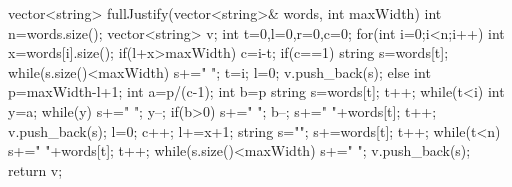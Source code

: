   vector<string> fullJustify(vector<string>& words, int maxWidth) {
        int n=words.size();
        vector<string> v;
        int t=0,l=0,r=0,c=0;
        for(int i=0;i<n;i++)
        {
            int x=words[i].size();            
            if(l+x>maxWidth)
            {
                c=i-t;
                if(c==1)
                {
                    string s=words[t];                   
                    while(s.size()<maxWidth)
                    {
                        s+=" ";
                    }
                    t=i;
                    l=0;
                    v.push_back(s);
                }
                else
                {
                  int p=maxWidth-l+1;
                  int a=p/(c-1);
                  int b=p%
                  string s=words[t];
                  t++;
                  while(t<i)
                  {
                      int y=a;
                      while(y)
                      {
                          s+=" ";
                          y--;
                      }
                      if(b>0)
                      {
                          s+=" ";
                          b--;
                      }
                      s+=" "+words[t];                   
                      t++;
                  }
                  v.push_back(s);
                  l=0;
                }
            }
            c++;
            l+=x+1;
        }
        string s="";
        s+=words[t];
        t++;
        while(t<n)
        {
            s+=" "+words[t];
            t++;
        }
        while(s.size()<maxWidth)
        {
            s+=" ";
        }
        v.push_back(s);
        return v;
    }